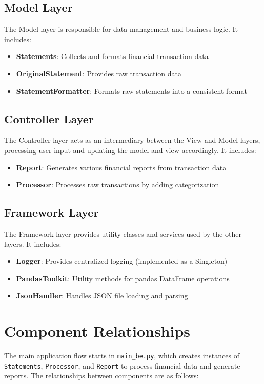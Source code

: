 \documentclass[11pt,a4paper]{report}
\begin{document}
\subsection{Model Layer}
The Model layer is responsible for data management and business logic. It includes:
\begin{itemize}
    \item \textbf{Statements}: Collects and formats financial transaction data
    \item \textbf{OriginalStatement}: Provides raw transaction data
    \item \textbf{StatementFormatter}: Formats raw statements into a consistent format
\end{itemize}

\subsection{Controller Layer}
The Controller layer acts as an intermediary between the View and Model layers, processing user input and updating the model and view accordingly. It includes:
\begin{itemize}
    \item \textbf{Report}: Generates various financial reports from transaction data
    \item \textbf{Processor}: Processes raw transactions by adding categorization
\end{itemize}

\subsection{Framework Layer}
The Framework layer provides utility classes and services used by the other layers. It includes:
\begin{itemize}
    \item \textbf{Logger}: Provides centralized logging (implemented as a Singleton)
    \item \textbf{PandasToolkit}: Utility methods for pandas DataFrame operations
    \item \textbf{JsonHandler}: Handles JSON file loading and parsing
\end{itemize}

\section{Component Relationships}
The main application flow starts in \texttt{main\_be.py}, which creates instances of \texttt{Statements}, \texttt{Processor}, and \texttt{Report} to process financial data and generate reports. The relationships between components are as follows:
\end{document}
